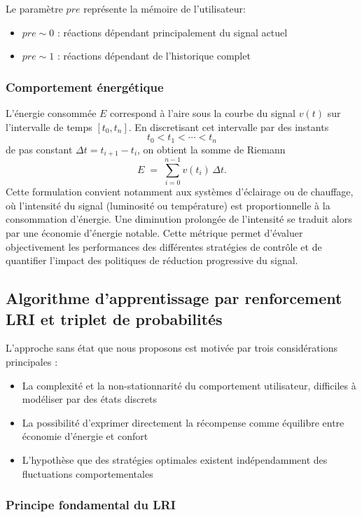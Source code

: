 \documentclass[a4paper,11pt]{article}
\begin{document}
Le paramètre $pre$ représente la mémoire de l'utilisateur:
\begin{itemize}
    \item $pre \sim 0$ : réactions dépendant principalement du signal actuel
    \item $pre \sim 1$ : réactions dépendant de l'historique complet
\end{itemize}


\subsubsection{Comportement énergétique}
L'énergie consommée $E$ correspond à l'aire sous la courbe du signal $v(t)$ sur l'intervalle de temps $[t_0, t_n]$. En discretisant cet intervalle par des instants
\[
t_0 < t_1 < \cdots < t_n
\]
de pas constant \(\Delta t = t_{i+1}-t_i\), on obtient la somme de Riemann
\[
E \;=\; \sum_{i=0}^{n-1} v(t_i)\,\Delta t.
\]
Cette formulation convient notamment aux systèmes d'éclairage ou de chauffage, où l’intensité du signal (luminosité ou température) est proportionnelle à la consommation d’énergie. Une diminution prolongée de l’intensité se traduit alors par une économie d’énergie notable. Cette métrique permet d’évaluer objectivement les performances des différentes stratégies de contrôle et de quantifier l’impact des politiques de réduction progressive du signal.

\subsection{Algorithme d'apprentissage par renforcement LRI et triplet de probabilités}

L'approche sans état que nous proposons est motivée par trois considérations principales :
\begin{itemize}
    \item La complexité et la non-stationnarité du comportement utilisateur, difficiles à modéliser par des états discrets
    \item La possibilité d'exprimer directement la récompense comme équilibre entre économie d'énergie et confort
    \item L'hypothèse que des stratégies optimales existent indépendamment des fluctuations comportementales
\end{itemize}

\subsubsection{Principe fondamental du LRI}
\end{document}
